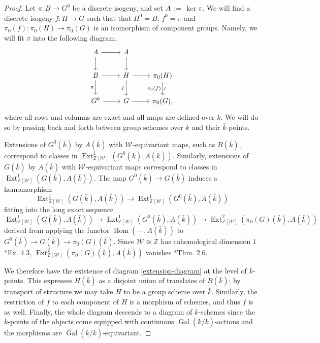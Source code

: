 \documentclass[10pt]{amsart}
\theoremstyle{plain}
\theoremstyle{definition}
\newcommand{\ZZ}{{\mathbb{Z}}}
\newcommand{\bFq}{\bar{k}}
\newcommand{\Fq}{k}
\newcommand{\Weil}[1]{\mathcal{W}_{#1}}
\DeclareMathOperator{\Gal}{Gal}
\DeclareMathOperator{\Hom}{Hom}
\DeclareMathOperator{\Ext}{Ext}
\newcommand{\ceq}{{\, :=\, }}
\begin{document}
\begin{proof}
Let $\pi: B \to G^0$ be a discrete isogeny, and set $A \ceq \ker \pi$.
  We will find a discrete isogeny $f: H\to G$
  such that that $H^0 = B$, $f^0 =\pi$ and
  $\pi_0(f) : \pi_0(H)\to \pi_0(G)$ is an isomorphism of component
  groups.  Namely, we will fit $\pi$ into the following diagram,
  \begin{equation}\label{extension-diagram}
  \begin{tikzcd}
  A \arrow{r} \dar & A \dar \\
  B \rar \dar[swap]{\pi} & H \rar \dar[swap]{f} & \pi_0(H) \arrow{d}[below,rotate=90]{\sim}[swap]{\pi_0(f)} \\
  G^0 \rar & G \rar & \pi_0(G),
  \end{tikzcd}
  \end{equation}
  where all rows and columns are exact and all maps are defined over
  $\Fq$.  We will do so by passing back and forth between group
  schemes over $\Fq$ and their $\bFq$-points.

  Extensions of $G^0(\bFq)$ by $A(\bFq)$ with $\Weil{}$-equivariant maps, such as $B(\bFq)$,
  correspond to classes in $\Ext^1_{\ZZ[\Weil{}]}(G^0(\bFq), A(\bFq))$.
  Similarly, extensions of $G(\bFq)$ by $A(\bFq)$ with $\Weil{}$-equivariant maps correspond to
  classes in $\Ext^1_{\ZZ[\Weil{}]}(G(\bFq), A(\bFq))$.  The map
  $G^0(\bFq) \to G(\bFq)$ induces a homomorphism
  \[
  \Ext^1_{\ZZ[\Weil{}]}(G(\bFq), A(\bFq)) \to \Ext^1_{\ZZ[\Weil{}]}(G^0(\bFq), A(\bFq))
  \]
  fitting into the long exact sequence 
  \[
  \Ext^1_{\ZZ[\Weil{}]}(G(\bFq), A(\bFq)) \to \Ext^1_{\ZZ[\Weil{}]}(G^0(\bFq), A(\bFq)) \to \Ext^2_{\ZZ[\Weil{}]}(\pi_0(G)(\bFq), A(\bFq))
  \]
  derived from applying
  the functor $\Hom(\mbox{---}, A(\bFq))$ to $G^0(\bFq) \to G(\bFq) \to \pi_0(G)(\bFq)$.
  Since $\Weil{} \cong \ZZ$ has cohomological dimension $1$ \cite{brown:CohomologyGrps}*{Ex. 4.3},
  $\Ext^2_{\ZZ[\Weil{}]}(\pi_0(G)(\bFq), A(\bFq))$ vanishes \cite{cartan-eilenberg:HomologicalAlgebra}*{Thm. 2.6}.

  We therefore have the existence of diagram \eqref{extension-diagram}
  at the level of $\bFq$-points.  This expresses $H(\bFq)$ as a
  disjoint union of translates of $B(\bFq)$; by transport of structure
  we may take $H$ to be a group scheme over $\bFq$.  Similarly, the
  restriction of $f$ to each component of $H$ is a morphism of
  schemes, and thus $f$ is as well.  Finally, the whole diagram
  descends to a diagram of $\Fq$-schemes since the $\bFq$-points of
  the objects come equipped with continuous $\Gal(\bFq/\Fq)$-actions and the
  morphisms are $\Gal(\bFq/\Fq)$-equivariant.
\end{proof}
\end{document}
